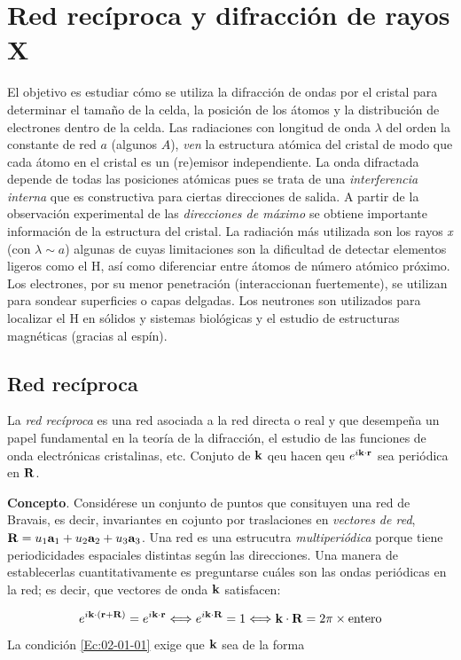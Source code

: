 \chapter{Red recíproca y difracción de rayos X} \label{Ch:02}

El objetivo es estudiar cómo se utiliza la difracción de ondas por el cristal para determinar el tamaño de la celda, la posición de los átomos y la distribución de electrones dentro de la celda. Las radiaciones con longitud de onda $\lambda$ del orden la constante de red $a$   (algunos $ A$), {\it ven} la estructura atómica del cristal de modo que cada átomo en el cristal es un (re)emisor independiente. La onda difractada depende de todas las posiciones atómicas pues se trata de una \textit{interferencia interna} que es constructiva para ciertas direcciones de salida. A partir de la observación experimental de las \textit{direcciones de máximo} se obtiene importante información de la estructura del cristal. La radiación más utilizada son los rayos {\it x} (con $\lambda \sim a$) algunas de cuyas limitaciones son la dificultad de detectar elementos ligeros como el H, así como diferenciar entre átomos de número atómico próximo. Los electrones, por su menor penetración (interaccionan fuertemente), se utilizan para sondear superficies o capas delgadas. Los neutrones son utilizados para localizar el H en sólidos y sistemas biológicas y el estudio de estructuras magnéticas (gracias al espín).

\section{Red recíproca}

La \textit{red recíproca} es una red asociada a la red directa o real y que desempeña un papel fundamental en la teoría de la difracción, el estudio de las funciones de onda electrónicas cristalinas, etc.  Conjuto de $\mathbf{k}$ qeu hacen qeu $e^{i\mathbf{k} \cdot \mathbf{r}}$ sea periódica en $\mathbf{R}$. 

\textbf{Concepto}. Considérese un conjunto de puntos que consituyen una red de Bravais, es decir, invariantes en cojunto por traslaciones en \textit{vectores de red}, $\mathbf{R} = u_1 \mathbf{a}_1 + u_2 \mathbf{a}_2 + u_3 \mathbf{a}_3$. Una red es una estrucutra \textit{multiperiódica} porque tiene periodicidades espaciales distintas según las direcciones. Una manera de establecerlas cuantitativamente es preguntarse cuáles son las ondas periódicas en la red; es decir, que vectores de onda $\mathbf{k}$ satisfacen:

\begin{equation}
    e^{i\mathbf{k} \cdot (\mathbf{r} + \mathbf{R})} = e^{i \mathbf{k} \cdot \mathbf{r}} \Longleftrightarrow  e^{i \mathbf{k} \cdot \mathbf{R}} = 1 \Longleftrightarrow \mathbf{k} \cdot \mathbf{R} = 2\pi \times \text{entero} \label{Ec:02-01-01}
\end{equation}
La condición \ref{Ec:02-01-01} exige que $\mathbf{k}$ sea de la forma 

